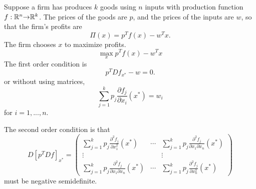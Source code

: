 \begin{example} 
  Suppose a firm has produces $k$ goods using $n$ inputs with production
  function $f: \mathbb{R}^n {\rightarrow} \mathbb{R}^k$. The prices of the goods are $p$, and the
  prices of the inputs are $w$, so that the firm's profits are 
  \[ \Pi(x) =  p^T f(x) -  w^Tx. \]
  The firm chooses $x$ to maximize profits.
  \[ \max_x p^T f(x) - w^T x \]
  The first order condition is
  \[ p^T Df_{x^*} - w = 0. \]
  or without using matrices,
  \[ \sum_{j=1}^k p_j \frac{\partial f_j}{\partial x_i}(x^*) = w_i \]
  for $i=1,..., n$. 

  The second order condition is that
  \[ D[p^T Df]_{x^*} = \begin{pmatrix} \sum_{j=1}^k p_j \frac{\partial^2
      f_j}{\partial x_1^2}(x^*) & \cdots & \sum_{j=1}^k p_j \frac{\partial^2
      f_j}{\partial x_1\partial x_n}(x^*)  \\ \vdots & & \vdots \\
    \sum_{j=1}^k p_j \frac{\partial^2
      f_j}{\partial x_1\partial x_n}(x^*) & \cdots & \sum_{j=1}^k p_j
    \frac{\partial^2 f_j}{\partial x_n^2}(x^*) \end{pmatrix} 
  \]
  must be negative semidefinite. 
\end{example}

